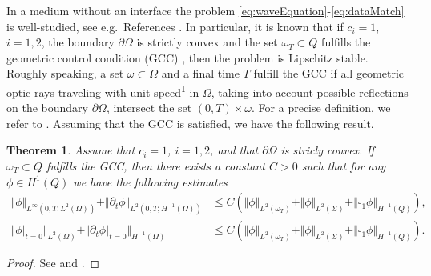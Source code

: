 \documentclass[sn-mathphys-num]{sn-jnl}
\newtheorem{thm}{Theorem}[section]
\numberwithin{equation}{section}
\newcommand{\dt}{\partial_t}
\begin{document}
\noindent In a medium without an interface the problem \eqref{eq:waveEquation}-\eqref{eq:dataMatch} is well-studied, see e.g.~References \cite{CM15,BFO20,BFMO21,MM21,DMS23,BDE24}. In particular, it is known that if $c_i = 1$, $i = 1,2$, the boundary $\partial \Omega$ is strictly convex and the set $\omega_T \subset Q$ fulfills the geometric control condition (GCC) \cite{BLR88,BLR92}, then the problem is Lipschitz stable. Roughly speaking, a set $\omega \subset \Omega$ and a final time $T$ fulfill the GCC if all geometric optic rays traveling with unit speed\textsuperscript{1}\footnotemark {} in $\Omega$, taking into account possible reflections on the boundary $\partial \Omega$, intersect the set $(0,T) \times \omega$. For a precise definition, we refer to \cite{BLR88,BLR92}. Assuming that the GCC is satisfied, we have the following result.

\begin{thm}\label{thm:Lipschitz}
    Assume that $c_i = 1$, $i = 1,2$, and that $\partial \Omega$ is stricly convex. If $\omega_T \subset Q$ fulfills the GCC, then there exists a constant $C > 0$ such that for any $\phi \in H^1(Q)$ we have the following estimates
    \begin{align*}
        \Vert \phi \Vert_{L^\infty(0,T;L^2(\Omega))} + \Vert \dt \phi \Vert_{L^2(0,T;H^{-1}(\Omega))} &\le C \left(  \Vert \phi \Vert_{L^2(\omega_T)} + \Vert \phi \Vert_{L^2(\Sigma)} + \Vert \square_1 \phi \Vert_{H^{-1}(Q)} \right), \\
        \Vert \phi \vert_{t = 0} \Vert_{L^2(\Omega)} + \Vert \dt \phi \vert_{t = 0} \Vert_{H^{-1}(\Omega)} &\le C \left(\Vert \phi \Vert_{L^2(\omega_T)} + \Vert \phi \Vert_{L^2(\Sigma)} + \Vert \square_1 \phi \Vert_{H^{-1}(Q)} \right). 
    \end{align*}
\end{thm}

\begin{proof}
    See \cite[Thm. A.4]{BFMO21control} and \cite[Rem. A.5]{BFMO21control}.
\end{proof}
\end{document}
